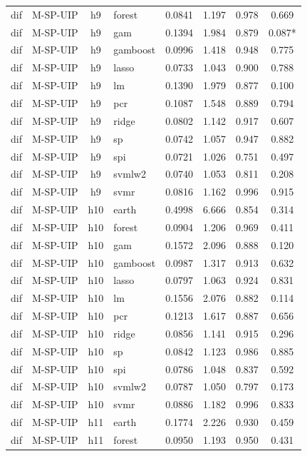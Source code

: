 \begin{ThreePartTable}
\begin{longtable}[t]{llclcccc}
dif & M-SP-UIP & h9 & forest & 0.0841 & 1.197 & 0.978 & 0.669\\
dif & M-SP-UIP & h9 & gam & 0.1394 & 1.984 & 0.879 & 0.087*\\
dif & M-SP-UIP & h9 & gamboost & 0.0996 & 1.418 & 0.948 & 0.775\\
dif & M-SP-UIP & h9 & lasso & 0.0733 & 1.043 & 0.900 & 0.788\\
dif & M-SP-UIP & h9 & lm & 0.1390 & 1.979 & 0.877 & 0.100\\
dif & M-SP-UIP & h9 & pcr & 0.1087 & 1.548 & 0.889 & 0.794\\
dif & M-SP-UIP & h9 & ridge & 0.0802 & 1.142 & 0.917 & 0.607\\
dif & M-SP-UIP & h9 & sp & 0.0742 & 1.057 & 0.947 & 0.882\\
dif & M-SP-UIP & h9 & spi & 0.0721 & 1.026 & 0.751 & 0.497\\
dif & M-SP-UIP & h9 & svmlw2 & 0.0740 & 1.053 & 0.811 & 0.208\\
dif & M-SP-UIP & h9 & svmr & 0.0816 & 1.162 & 0.996 & 0.915\\
\addlinespace
dif & M-SP-UIP & h10 & earth & 0.4998 & 6.666 & 0.854 & 0.314\\
dif & M-SP-UIP & h10 & forest & 0.0904 & 1.206 & 0.969 & 0.411\\
dif & M-SP-UIP & h10 & gam & 0.1572 & 2.096 & 0.888 & 0.120\\
dif & M-SP-UIP & h10 & gamboost & 0.0987 & 1.317 & 0.913 & 0.632\\
dif & M-SP-UIP & h10 & lasso & 0.0797 & 1.063 & 0.924 & 0.831\\
dif & M-SP-UIP & h10 & lm & 0.1556 & 2.076 & 0.882 & 0.114\\
dif & M-SP-UIP & h10 & pcr & 0.1213 & 1.617 & 0.887 & 0.656\\
dif & M-SP-UIP & h10 & ridge & 0.0856 & 1.141 & 0.915 & 0.296\\
dif & M-SP-UIP & h10 & sp & 0.0842 & 1.123 & 0.986 & 0.885\\
dif & M-SP-UIP & h10 & spi & 0.0786 & 1.048 & 0.837 & 0.592\\
dif & M-SP-UIP & h10 & svmlw2 & 0.0787 & 1.050 & 0.797 & 0.173\\
dif & M-SP-UIP & h10 & svmr & 0.0886 & 1.182 & 0.996 & 0.833\\
\addlinespace
dif & M-SP-UIP & h11 & earth & 0.1774 & 2.226 & 0.930 & 0.459\\
dif & M-SP-UIP & h11 & forest & 0.0950 & 1.193 & 0.950 & 0.431\\

\end{longtable}
\end{ThreePartTable}
